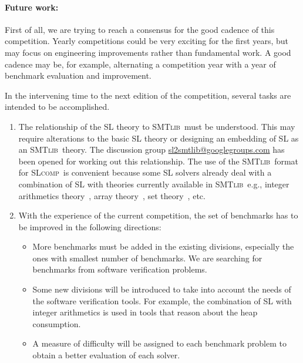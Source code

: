 \documentclass[twoside,11pt]{article}
\newcommand{\smtlib}{\textsc{SMTlib}}
\newcommand{\slcomp}{\textsc{SLcomp}}
\begin{document}
\paragraph{Future work:}
First of all, we are trying to reach a consensus for the good cadence of this competition. Yearly competitions could be very exciting for the first years, but may focus on engineering improvements rather than fundamental work. 
A good cadence may be, for example, alternating a competition year with a year of benchmark evaluation and improvement.

In the intervening time to the next edition of the competition, several tasks are intended to be accomplished.
\begin{enumerate}

\item The relationship of the SL theory to \smtlib\ must be understood. This may require alterations to
the basic SL theory or designing an embedding of SL as an \smtlib\ theory.
The discussion group \url{sl2smtlib@googlegroups.com} has been opened for working out this relationship. 
The use of the \smtlib\ format for \slcomp\ is convenient because some SL solvers already deal with a combination of SL with theories currently available in \smtlib\, e.g., 
integer arithmetics theory~\cite{PerezR11}, array theory~\cite{BouajjaniDES12-vmcai}, set theory~\cite{PiskacWZ13}, etc.


\item With the experience of the current competition, the set of benchmarks has to be improved in the following directions:
\begin{itemize}
\item More benchmarks must be added in the existing divisions, especially the ones with smallest number of benchmarks. 
We are searching for benchmarks from software verification problems.

\item Some new divisions will be introduced to take into account the needs of the software verification tools. For example, the combination of SL with integer arithmetics is used in tools that reason about the heap consumption.

\item A measure of difficulty will be assigned to each benchmark problem to obtain a better evaluation of each solver.
\end{itemize}


\end{enumerate}
\end{document}
